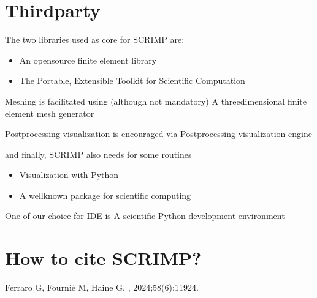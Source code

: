 \documentclass[letterpaper,10pt,english]{sphinxmanual}
\begin{document}
\section{Third\sphinxhyphen{}party}
\label{\detokenize{index:third-party}}
\sphinxAtStartPar
The two  libraries used as core for SCRIMP are:
\begin{itemize}
\item {} 
\sphinxAtStartPar
{} \textendash{} An open\sphinxhyphen{}source finite element library

\item {} 
\sphinxAtStartPar
{} \textendash{} The Portable, Extensible Toolkit for Scientific Computation

\end{itemize}

\sphinxAtStartPar
Meshing is facilitated using (although not mandatory)  \textendash{} A three\sphinxhyphen{}dimensional finite element mesh generator

\sphinxAtStartPar
Post\sphinxhyphen{}processing visualization is encouraged via  \textendash{} Post\sphinxhyphen{}processing visualization engine

\sphinxAtStartPar
and finally, SCRIMP also needs for some routines
\begin{itemize}
\item {} 
\sphinxAtStartPar
{} \textendash{} Visualization with Python

\item {} 
\sphinxAtStartPar
{} \textendash{} A well\sphinxhyphen{}known package for scientific computing

\end{itemize}

\sphinxAtStartPar
One of our choice for IDE is  \textendash{} A scientific Python development environment


\section{How to cite SCRIMP?}
\label{\detokenize{index:how-to-cite-scrimp}}
\sphinxAtStartPar
Ferraro G, Fournié M, Haine G.
, 2024;58(6):119\textendash{}24.
\end{document}
